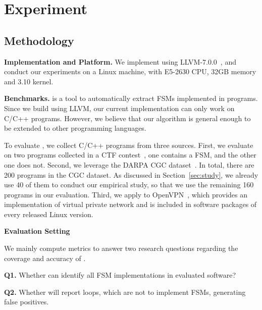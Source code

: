 \section{Experiment}

\subsection{Methodology}

\noindent\textbf{Implementation and Platform.} 
We implement \Tool{} using LLVM-7.0.0~\cite{LLVM}, 
and conduct our experiments on a Linux machine, 
with E5-2630 CPU, 32GB memory and 3.10 kernel. 

\noindent\textbf{Benchmarks.}
\Tool{} is a tool to automatically extract FSMs implemented in programs. 
Since we build \Tool{} using LLVM, 
our current implementation can only work on C/C++ programs.  
However, we believe that our algorithm is general enough 
to be extended to other programming languages. 

To evaluate \Tool{}, we collect C/C++ programs from three sources. 
First, we evaluate \Tool{} on two programs collected in a CTF contest~\cite{ctf}, 
one contains a FSM, and the other one does not. 
Second, we leverage the DARPA CGC dataset~\cite{CGC}. 
In total, there are 200 programs in the CGC dataset.
As discussed in Section~\ref{sec:study}, 
we already use 40 of them to conduct our empirical study,
so that we use the remaining 160 programs in our evaluation.
Third, we apply \Tool{} to OpenVPN~\cite{openvpn}, 
which provides an implementation of virtual private network and 
is included in software packages of every released Linux version. 



\noindent\textbf{Evaluation Setting}


We mainly compute metrics to answer two research questions regarding the coverage and accuracy of \Tool{}.

\textbf{Q1.} Whether \Tool{} can identify all FSM implementations in evaluated software?
 
\textbf{Q2.} Whether \Tool{} will report loops, which are not to implement FSMs, 
generating false positives. 

